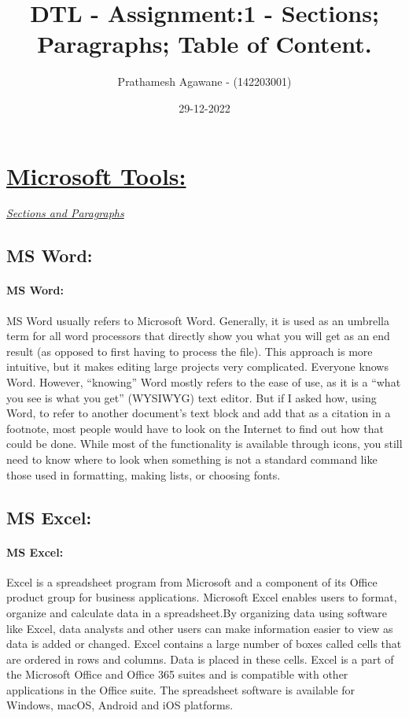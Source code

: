 \documentclass{article}
\title{DTL - Assignment:1 - Sections; Paragraphs;
Table of Content.}
\author{Prathamesh Agawane - (142203001)}
\date {29-12-2022}
\begin{document}
\maketitle
\newpage


\tableofcontents 


\newpage
\section{\underline{Microsoft Tools:}}
\underline{\emph{Sections and Paragraphs}}
	
\subsection{MS Word:}
\paragraph{MS Word:}
MS Word usually refers to Microsoft Word. Generally, it is used as an umbrella term for all word processors that directly show you what you will get as an end result (as opposed to first having to process the file). This approach is more intuitive, but it makes editing large projects very complicated. Everyone knows Word. However, “knowing” Word mostly refers to the ease of use, as it is a “what you see is what you get” (WYSIWYG) text editor. But if I asked how, using Word, to refer to another document’s text block and add that as a citation in a footnote, most people would have to look on the Internet to find out how that could be done. While most of the functionality is available through icons, you still need to know where to look when something is not a standard command like those used in formatting, making lists, or choosing fonts.

\subsection{MS Excel:}
\paragraph{MS Excel:}
Excel is a spreadsheet program from Microsoft and a component of its Office product group for business applications. Microsoft Excel enables users to format, organize and calculate data in a spreadsheet.By organizing data using software like Excel, data analysts and other users can make information easier to view as data is added or changed. Excel contains a large number of boxes called cells that are ordered in rows and columns. Data is placed in these cells. Excel is a part of the Microsoft Office and Office 365 suites and is compatible with other applications in the Office suite. The spreadsheet software is available for Windows, macOS, Android and iOS platforms.
\end{document}
